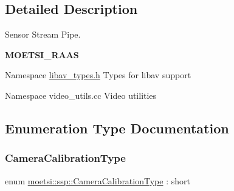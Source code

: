\subsection{Detailed Description}
Sensor Stream Pipe. 

{\bfseries M\+O\+E\+T\+S\+I\+\_\+\+R\+A\+AS}

Namespace \hyperlink{libav__types_8h_source}{libav\+\_\+types.\+h} Types for libav support

Namespace video\+\_\+utils.\+cc Video utilities 

\subsection{Enumeration Type Documentation}
\mbox{\label{namespacemoetsi_1_1ssp_a1f51291db51233dc5865d42e6ee36ef8}} 
\subsubsection{\texorpdfstring{Camera\+Calibration\+Type}{CameraCalibrationType}\hspace{0.1cm}{\footnotesize\ttfamily [1/2]}}
{\footnotesize\ttfamily enum \hyperlink{namespacemoetsi_1_1ssp_a1f51291db51233dc5865d42e6ee36ef8}{moetsi\+::ssp\+::\+Camera\+Calibration\+Type} \+: short\hspace{0.3cm}{\ttfamily [strong]}}

